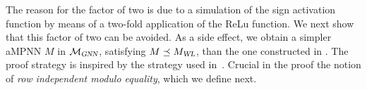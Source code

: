 The reason for the factor of two  is due to a simulation of the sign activation function by means of a two-fold application of the ReLu function. We next show that this factor of two can be avoided. As a side effect, we obtain a simpler aMPNN $M$ in $\mathcal{M}_{\textsl{GNN}}$, satisfying $M\preceq M_{\textsl{WL}}$, than the one constructed in \cite{grohewl}. The proof strategy is inspired by the strategy used in~\cite{grohewl}. Crucial in the proof the notion of \textit{row independent modulo equality}, which we define next.

